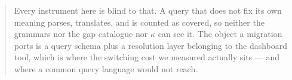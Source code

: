 \begin{abstract}
Every instrument here is blind to that. A query that does not fix its own meaning parses,
translates, and is counted as covered, so neither the grammars nor the gap catalogue nor
$\kappa$ can see it. The object a migration ports is a query schema plus a resolution
layer belonging to the dashboard tool, which is where the switching cost we measured
actually sits --- and where a common query language would not reach.
\end{abstract}











\small

